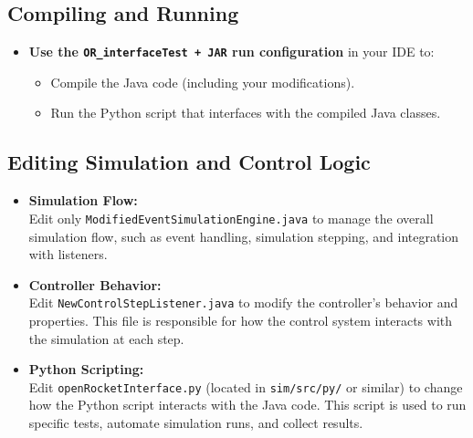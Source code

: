 \documentclass{amsdtx}
\providecommand{\tightlist}{%
  \setlength{\itemsep}{0pt}\setlength{\parskip}{0pt}}
\begin{document}
\subsection{Compiling and Running}\label{compiling-and-running}

\begin{itemize}
\tightlist
\item
  \textbf{Use the \texttt{OR\_interfaceTest\ +\ JAR} run configuration}
  in your IDE to:

  \begin{itemize}
  \tightlist
  \item
    Compile the Java code (including your modifications).
  \item
    Run the Python script that interfaces with the compiled Java
    classes.
  \end{itemize}
\end{itemize}

\subsection{Editing Simulation and Control
Logic}\label{editing-simulation-and-control-logic}

\begin{itemize}
\item
  \textbf{Simulation Flow:}\\
  Edit only \texttt{ModifiedEventSimulationEngine.java} to manage the
  overall simulation flow, such as event handling, simulation stepping,
  and integration with listeners.
\item
  \textbf{Controller Behavior:}\\
  Edit \texttt{NewControlStepListener.java} to modify the controller's
  behavior and properties. This file is responsible for how the control
  system interacts with the simulation at each step.
\item
  \textbf{Python Scripting:}\\
  Edit \texttt{openRocketInterface.py} (located in \texttt{sim/src/py/}
  or similar) to change how the Python script interacts with the Java
  code. This script is used to run specific tests, automate simulation
  runs, and collect results.
\end{itemize}
\end{document}
